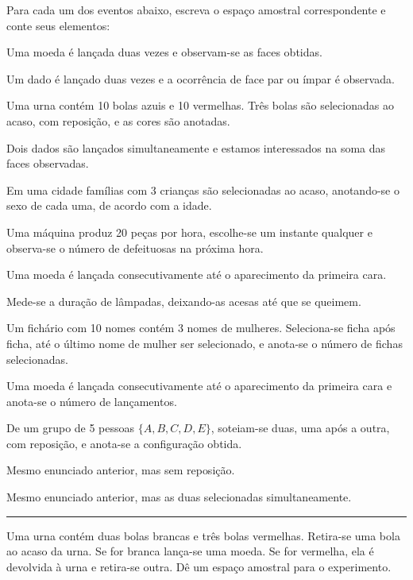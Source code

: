 \documentclass[a4paper,11pt,fleqn]{article}\usepackage[]{graphicx}\usepackage[]{color}
\theoremstyle{definition}
\begin{document}
\begin{compactenum} %
\item Para cada um dos eventos abaixo, escreva o espaço amostral
  correspondente e conte seus elementos:
  \begin{compactenum}
  \item Uma moeda é lançada duas vezes e observam-se as faces obtidas.
  \item Um dado é lançado duas vezes e a ocorrência de face par ou ímpar
    é observada.
  \item Uma urna contém 10 bolas azuis e 10 vermelhas. Três bolas são
    selecionadas ao acaso, com reposição, e as cores são anotadas.
  \item Dois dados são lançados simultaneamente e estamos interessados
    na soma das faces observadas.
  \item Em uma cidade famílias com 3 crianças são selecionadas ao acaso,
    anotando-se o sexo de cada uma, de acordo com a idade.
  \item Uma máquina produz 20 peças por hora, escolhe-se um instante
    qualquer e observa-se o número de defeituosas na próxima hora.
  \item Uma moeda é lançada consecutivamente até o aparecimento da
    primeira cara.
  \item Mede-se a duração de lâmpadas, deixando-as acesas até que se
    queimem.
  \item Um fichário com 10 nomes contém 3 nomes de mulheres.
    Seleciona-se ficha após ficha, até o último nome de mulher ser
    selecionado, e anota-se o número de fichas selecionadas.
  \item Uma moeda é lançada consecutivamente até o aparecimento da
    primeira cara e anota-se o número de lançamentos.
  \item De um grupo de 5 pessoas $\{A, B, C, D, E\}$, soteiam-se duas, uma
    após a outra, com reposição, e anota-se a configuração obtida.
  \item Mesmo enunciado anterior, mas sem reposição.
  \item Mesmo enunciado anterior, mas as duas selecionadas
    simultaneamente.
  \end{compactenum}

\vspace{0.3cm}
\hrule
\vspace{0.3cm}

\item Uma urna contém duas bolas brancas e três bolas vermelhas.
  Retira-se uma bola ao acaso da urna. Se for branca lança-se uma moeda.
  Se for vermelha, ela é devolvida à urna e retira-se outra. Dê um
  espaço amostral para o experimento.


\end{compactenum}
\end{document}
